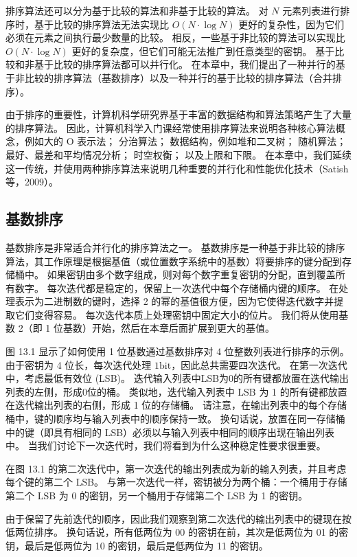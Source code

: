 排序算法还可以分为基于比较的算法和非基于比较的算法。 对 $N$ 元素列表进行排序时，基于比较的排序算法无法实现比 $O(N \cdot \log N)$ 更好的复杂性，因为它们必须在元素之间执行最少数量的比较。 相反，一些基于非比较的算法可以实现比 $O(N \cdot \log N)$ 更好的复杂度，但它们可能无法推广到任意类型的密钥。 基于比较和非基于比较的排序算法都可以并行化。 在本章中，我们提出了一种并行的基于非比较的排序算法（基数排序）以及一种并行的基于比较的排序算法（合并排序）。

由于排序的重要性，计算机科学研究界基于丰富的数据结构和算法策略产生了大量的排序算法。 因此，计算机科学入门课经常使用排序算法来说明各种核心算法概念，例如大的 $\mathrm{O}$ 表示法； 分治算法； 数据结构，例如堆和二叉树； 随机算法； 最好、最差和平均情况分析； 时空权衡； 以及上限和下限。 在本章中，我们延续这一传统，并使用两种排序算法来说明几种重要的并行化和性能优化技术（Satish 等，2009）。

\subsection{基数排序}
基数排序是非常适合并行化的排序算法之一。 基数排序是一种基于非比较的排序算法，其工作原理是根据基值（或位置数字系统中的基数）将要排序的键分配到存储桶中。 如果密钥由多个数字组成，则对每个数字重复密钥的分配，直到覆盖所有数字。 每次迭代都是稳定的，保留上一次迭代中每个存储桶内键的顺序。 在处理表示为二进制数的键时，选择 2 的幂的基值很方便，因为它使得迭代数字并提取它们变得容易。 每次迭代本质上处理密钥中固定大小的位片。 我们将从使用基数 2（即 1 位基数）开始，然后在本章后面扩展到更大的基值。

图 13.1 显示了如何使用 1 位基数通过基数排序对 4 位整数列表进行排序的示例。 由于密钥为 4 位长，每次迭代处理 $1 \mathrm{bit}$，因此总共需要四次迭代。 在第一次迭代中，考虑最低有效位 (LSB)。 迭代输入列表中LSB为0的所有键都放置在迭代输出列表的左侧，形成0位的桶。 类似地，迭代输入列表中 LSB 为 1 的所有键都放置在迭代输出列表的右侧，形成 1 位的存储桶。 请注意，在输出列表中的每个存储桶中，键的顺序均与输入列表中的顺序保持一致。 换句话说，放置在同一存储桶中的键（即具有相同的 LSB）必须以与输入列表中相同的顺序出现在输出列表中。 当我们讨论下一次迭代时，我们将看到为什么这种稳定性要求很重要。

在图 13.1 的第二次迭代中，第一次迭代的输出列表成为新的输入列表，并且考虑每个键的第二个 LSB。 与第一次迭代一样，密钥被分为两个桶：一个桶用于存储第二个 LSB 为 0 的密钥，另一个桶用于存储第二个 LSB 为 1 的密钥。

由于保留了先前迭代的顺序，因此我们观察到第二次迭代的输出列表中的键现在按低两位排序。 换句话说，所有低两位为 00 的密钥在前，其次是低两位为 01 的密钥，最后是低两位为 10 的密钥，最后是低两位为 11 的密钥。

